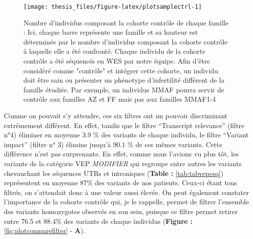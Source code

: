 \documentclass[12pt,twoside]{reedthesis}
\theoremstyle{definition}
\theoremstyle{definition}
\theoremstyle{remark}
\begin{document}
  \begin{figure}
  
  {\centering \texttt{[image: thesis\_files/figure-latex/plotsamplectrl-1]} 
  
  }
  
  \caption[Nombre d'individus composant la cohorte contrôle de chaque famille]{Nombre d'individus composant la cohorte contrôle de chaque famille : Ici, chaque barre représente une famille et sa hauteur est déterminée par le nombre d'individus composant la cohorte contrôle à laquelle elle a été confronté. Chaque individu de la cohorte contrôle a été séquencés en WES par notre équipe. Afin d'être considéré comme "contrôle" et intégrer cette cohorte, un individu doit être sain ou présenter un phénotype d'infertilité différent de la famille étudiée. Par exemple, un individus MMAF pourra servir de contrôle aux familles AZ et FF mais pas aux familles MMAF1-4}\label{fig:plotsamplectrl}
  \end{figure}
  
  \newpage
  
  \newpage
  
  Comme on pouvait s'y attendre, ces six filtres ont un pouvoir
  discriminant extrêmement différent. En effet, tandis que le filtre
  ``Transcript relevance'' (filtre n°4) éliminer en moyenne 3.9 \% des
  variants de chaque individu, le filtre ``Variant impact'' (filtre n° 3)
  élimine jusqu'à 90.1 \% de ces mêmes variants. Cette différence n'est
  pas surprenante. En effet, comme nous l'avions vu plus tôt, les variants
  de la catégorie VEP \emph{MODIFIER} qui regroupe entre autres les
  variants chevauchant les séquences UTRs et introniques (\textbf{Table :}
  \ref{tab:tabvepcsq}) représentent en moyenne 87\% des variants de nos
  patients. Ceux-ci étant tous filtrés, on s'attendait donc à une valeur
  aussi élevée. On peut également constater l'importance de la cohorte
  contrôle qui, je le rappelle, permet de filtrer l'ensemble des variants
  homozygotes observés en son sein, puisque ce filtre permet retirer entre
  76.5 et 88.4\% des variants de chaque individus (\textbf{Figure :}
  \ref{fig:plotcomparefilter} - \textbf{A}).
  
\end{document}

